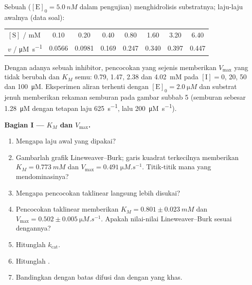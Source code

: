 \begin{problem}
\label{pb:b3:complex-kinetics:1}
Sebuah  ($[\mathrm E]_0 = \qty{5.0}{nM}$ dalam pengujian) menghidrolisis
substratnya; laju-laju awalnya (data soal):
\begin{center}\small
\begin{tabular}{lccccccc}
\hline
$[\mathrm S]$ / mM & 0.10 & 0.20 & 0.40 & 0.80 & 1.60 & 3.20 & 6.40 \\
$v$ / \unit{\micro M.s^{-1}} & 0.0566 & 0.0981 & 0.169 & 0.247 & 0.340 & 0.397 & 0.447 \\ \hline
\end{tabular}
\end{center}
Dengan adanya sebuah inhibitor, pencocokan yang sejenis memberikan $V_{\max}$ yang
tidak berubah dan $K_M$ semu: 0.79, 1.47, 2.38 dan \qty{4.02}{mM} pada
$[\mathrm I] = 0$, 20, 50 dan
\qty{100}{\micro M}. Eksperimen aliran terhenti dengan $[\mathrm E]_0 = \qty{2.0}{\micro M}$
dan substrat jenuh memberikan rekaman semburan pada gambar subbab 5 (semburan
sebesar \qty{1.28}{\micro M} dengan tetapan laju \qty{625}{s^{-1}}, lalu
\qty{200}{\micro M.s^{-1}}).

\medskip\noindent\textbf{Bagian I --- $K_M$ dan $V_{\max}$.}
\begin{enumerate}[beginpenalty=10000]
  \item Mengapa laju awal yang dipakai?
  \item Gambarlah grafik Lineweaver--Burk; garis kuadrat terkecilnya memberikan
        $K_M =
        \qty{0.773}{mM}$ dan $V_{\max} = \qty{0.491}{\micro M.s^{-1}}$. Titik-titik mana
        yang mendominasinya?
  \item Mengapa pencocokan taklinear langsung lebih disukai?
  \item Pencocokan taklinear memberikan $K_M = 0.801 \pm \qty{0.023}{mM}$ dan
        $V_{\max} = 0.502 \pm
        \qty{0.005}{\micro M.s^{-1}}$. Apakah nilai-nilai Lineweaver--Burk sesuai
        dengannya?
  \item Hitunglah $k_{\mathrm{cat}}$.
  \item Hitunglah .
  \item Bandingkan dengan batas difusi dan dengan  yang khas.
\end{enumerate}


\end{problem}
